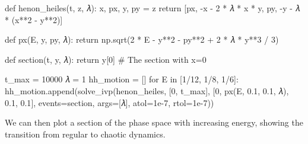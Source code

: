 \documentclass[
  letterpaper,
  DIV=11,
  numbers=noendperiod]{scrreprt}
\newenvironment{Shaded}{\begin{snugshade}}{\end{snugshade}}
\newcommand{\CommentTok}[1]{\textcolor[rgb]{0.37,0.37,0.37}{#1}}
\newcommand{\ControlFlowTok}[1]{\textcolor[rgb]{0.00,0.23,0.31}{#1}}
\newcommand{\DecValTok}[1]{\textcolor[rgb]{0.68,0.00,0.00}{#1}}
\newcommand{\FloatTok}[1]{\textcolor[rgb]{0.68,0.00,0.00}{#1}}
\newcommand{\KeywordTok}[1]{\textcolor[rgb]{0.00,0.23,0.31}{#1}}
\newcommand{\NormalTok}[1]{\textcolor[rgb]{0.00,0.23,0.31}{#1}}
\newcommand{\OperatorTok}[1]{\textcolor[rgb]{0.37,0.37,0.37}{#1}}
\theoremstyle{definition}
\theoremstyle{remark}
\begin{document}
\begin{Shaded}
\begin{Highlighting}[]
\KeywordTok{def}\NormalTok{ henon\_heiles(t, z, 𝜆): }
\NormalTok{    x, px, y, py }\OperatorTok{=}\NormalTok{ z}
    \ControlFlowTok{return}\NormalTok{ [px, }\OperatorTok{{-}}\NormalTok{x }\OperatorTok{{-}} \DecValTok{2} \OperatorTok{*}\NormalTok{ 𝜆 }\OperatorTok{*}\NormalTok{ x }\OperatorTok{*}\NormalTok{ y, py, }\OperatorTok{{-}}\NormalTok{y }\OperatorTok{{-}}\NormalTok{ 𝜆 }\OperatorTok{*}\NormalTok{ (x}\OperatorTok{**}\DecValTok{2} \OperatorTok{{-}}\NormalTok{ y}\OperatorTok{**}\DecValTok{2}\NormalTok{)]}

\KeywordTok{def}\NormalTok{ px(E, y, py, 𝜆):}
    \ControlFlowTok{return}\NormalTok{ np.sqrt(}\DecValTok{2} \OperatorTok{*}\NormalTok{ E }\OperatorTok{{-}}\NormalTok{ y}\OperatorTok{**}\DecValTok{2} \OperatorTok{{-}}\NormalTok{ py}\OperatorTok{**}\DecValTok{2} \OperatorTok{+} \DecValTok{2} \OperatorTok{*}\NormalTok{ 𝜆 }\OperatorTok{*}\NormalTok{ y}\OperatorTok{**}\DecValTok{3} \OperatorTok{/} \DecValTok{3}\NormalTok{)}

\KeywordTok{def}\NormalTok{ section(t, y, 𝜆): }\ControlFlowTok{return}\NormalTok{ y[}\DecValTok{0}\NormalTok{] }\CommentTok{\# The section with x=0}

\NormalTok{t\_max }\OperatorTok{=} \DecValTok{10000}
\NormalTok{𝜆 }\OperatorTok{=} \DecValTok{1}
\NormalTok{hh\_motion }\OperatorTok{=}\NormalTok{ []}
\ControlFlowTok{for}\NormalTok{ E }\KeywordTok{in}\NormalTok{ [}\DecValTok{1}\OperatorTok{/}\DecValTok{12}\NormalTok{, }\DecValTok{1}\OperatorTok{/}\DecValTok{8}\NormalTok{, }\DecValTok{1}\OperatorTok{/}\DecValTok{6}\NormalTok{]:}
\NormalTok{    hh\_motion.append(solve\_ivp(henon\_heiles, [}\DecValTok{0}\NormalTok{, t\_max], [}\DecValTok{0}\NormalTok{, px(E, }\FloatTok{0.1}\NormalTok{, }\FloatTok{0.1}\NormalTok{, 𝜆), }\FloatTok{0.1}\NormalTok{, }\FloatTok{0.1}\NormalTok{], events}\OperatorTok{=}\NormalTok{section, args}\OperatorTok{=}\NormalTok{[𝜆], atol}\OperatorTok{=}\FloatTok{1e{-}7}\NormalTok{, rtol}\OperatorTok{=}\FloatTok{1e{-}7}\NormalTok{))}
\end{Highlighting}
\end{Shaded}

We can then plot a section of the phase space with increasing energy,
showing the transition from regular to chaotic dynamics.
\end{document}
